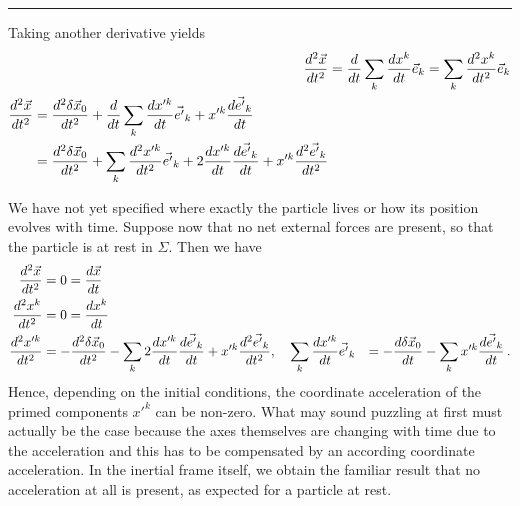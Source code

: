 \documentclass[../class_mech_main.tex]{subfiles}
\begin{document}
\begin{itemize}
	\hrule


	Taking another derivative yields
	\begin{align}
		\dv[2]{\vec{x}}{t} &= \dv{t} \sum_k \dv{x^k}{t} \vec{e}_k
		= \sum_k \dv[2]{x^k}{t} \vec{e}_k
		\label{eq:acceleration_from_inert_frame_in_inert_frame}
		\\
		\begin{split}
			\dv[2]{\vec{x}}{t} &= \dv[2]{\delta \vec{x}_0}{t} + \dv{t} \sum_k \dv{x'^k}{t} \vec{e'}_k + x'^k \dv{\vec{e'}_k}{t}
			\\
			&= \dv[2]{\delta \vec{x}_0}{t} + \sum_k \dv[2]{x'^k}{t} \vec{e'}_k + 2 \dv{x'^k}{t} \dv{\vec{e'}_k}{t} + x'^k \dv[2]{\vec{e'}_k}{t}
		\end{split}
		\label{eq:acceleration_from_inert_frame_in_accel_frame}
	\end{align}

	We have not yet specified where exactly the particle lives or how its position evolves with time. Suppose now that no net external forces are present, so that the particle is at rest in $\Sigma$. Then we have
	\begin{align*}
		\dv[2]{\vec{x}}{t} &= 0 = \dv{\vec{x}}{t}
		\\
		\dv[2]{x^k}{t} &= 0 = \dv{x^k}{t}
		\\
		\dv[2]{x'^k}{t} &= - \dv[2]{\delta \vec{x}_0}{t} - \sum_k 2 \dv{x'^k}{t} \dv{\vec{e'}_k}{t} + x'^k \dv[2]{\vec{e'}_k}{t},
		\quad \sum_k \dv{x'^k}{t} \vec{e'}_k &= - \dv{\delta \vec{x}_0}{t} - \sum_k x'^k \dv{\vec{e'}_k}{t}
		\, .
	\end{align*}
	Hence, depending on the initial conditions, the coordinate acceleration of the primed components $x'^k$ can be non-zero. What may sound puzzling at first must actually be the case because the axes themselves are changing with time due to the acceleration and this has to be compensated by an according coordinate acceleration. In the inertial frame itself, we obtain the familiar result that no acceleration at all is present, as expected for a particle at rest.



\end{itemize}
\end{document}
